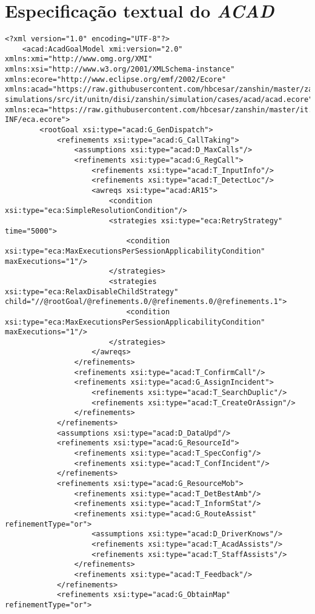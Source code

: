 \chapter{Especificação textual do \textit{ACAD}}

\begin{lstlisting}[caption={Especifcação do Sistema ACAD}]
<?xml version="1.0" encoding="UTF-8"?>
	<acad:AcadGoalModel xmi:version="2.0" xmlns:xmi="http://www.omg.org/XMI" xmlns:xsi="http://www.w3.org/2001/XMLSchema-instance" xmlns:ecore="http://www.eclipse.org/emf/2002/Ecore" xmlns:acad="https://raw.githubusercontent.com/hbcesar/zanshin/master/zanshin-simulations/src/it/unitn/disi/zanshin/simulation/cases/acad/acad.ecore" xmlns:eca="https://raw.githubusercontent.com/hbcesar/zanshin/master/it.unitn.disi.zanshin.core/META-INF/eca.ecore">
		<rootGoal xsi:type="acad:G_GenDispatch">
			<refinements xsi:type="acad:G_CallTaking">
				<assumptions xsi:type="acad:D_MaxCalls"/>
				<refinements xsi:type="acad:G_RegCall">
					<refinements xsi:type="acad:T_InputInfo"/>
					<refinements xsi:type="acad:T_DetectLoc"/>
					<awreqs xsi:type="acad:AR15">										
						<condition xsi:type="eca:SimpleResolutionCondition"/>
						<strategies xsi:type="eca:RetryStrategy" time="5000">
							<condition xsi:type="eca:MaxExecutionsPerSessionApplicabilityCondition" maxExecutions="1"/>
						</strategies>
						<strategies xsi:type="eca:RelaxDisableChildStrategy" child="//@rootGoal/@refinements.0/@refinements.0/@refinements.1">
							<condition xsi:type="eca:MaxExecutionsPerSessionApplicabilityCondition" maxExecutions="1"/>
						</strategies>
					</awreqs>
				</refinements>
				<refinements xsi:type="acad:T_ConfirmCall"/>
				<refinements xsi:type="acad:G_AssignIncident">
					<refinements xsi:type="acad:T_SearchDuplic"/>
					<refinements xsi:type="acad:T_CreateOrAssign"/>
				</refinements>
			</refinements>
			<assumptions xsi:type="acad:D_DataUpd"/>
			<refinements xsi:type="acad:G_ResourceId">
				<refinements xsi:type="acad:T_SpecConfig"/>
				<refinements xsi:type="acad:T_ConfIncident"/>
			</refinements>
			<refinements xsi:type="acad:G_ResourceMob">
				<refinements xsi:type="acad:T_DetBestAmb"/>
				<refinements xsi:type="acad:T_InformStat"/>
				<refinements xsi:type="acad:G_RouteAssist" refinementType="or">
					<assumptions xsi:type="acad:D_DriverKnows"/>
					<refinements xsi:type="acad:T_AcadAssists"/>
					<refinements xsi:type="acad:T_StaffAssists"/>
				</refinements>
				<refinements xsi:type="acad:T_Feedback"/>
			</refinements>
			<refinements xsi:type="acad:G_ObtainMap" refinementType="or">

\end{lstlisting}
